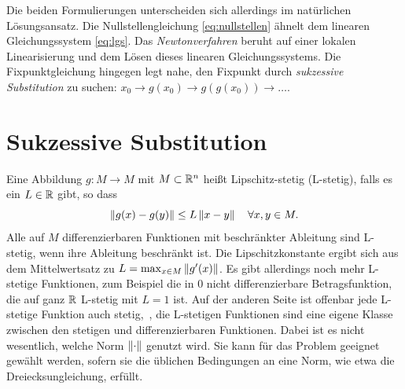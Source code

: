 Die beiden Formulierungen unterscheiden sich allerdings im natürlichen
Lösungsansatz. Die Nullstellengleichung \eqref{eq:nullstellen} ähnelt
dem linearen Gleichungssystem \eqref{eq:lgs}. Das
\emph{Newtonverfahren} beruht auf einer lokalen Linearisierung und dem
Lösen dieses linearen Gleichungssystems. Die Fixpunktgleichung
hingegen legt nahe, den Fixpunkt durch \emph{sukzessive Substitution}
zu suchen: $x_0\to g(x_0)\to g(g(x_0))\to\ldots$.

\section{Sukzessive Substitution}

Eine Abbildung $g:M\to M$ mit $M\subset\mathbb{R}^n$ heißt Lipschitz-stetig
(L-stetig), falls es ein $L\in\mathbb{R}$ gibt, so dass
\begin{equation}
  \left\lVert{g(x) - g(y)}\right\rVert \le L \left\lVert{x - y}\right\rVert\quad\forall x,y\in M.
\end{equation}
Alle auf $M$ differenzierbaren Funktionen mit beschränkter Ableitung
sind L-stetig, wenn ihre Ableitung beschränkt ist. Die
Lipschitzkonstante ergibt sich aus dem Mittelwertsatz zu $L=\max_{x\in
  M}\left\lVert{g'(x)}\right\rVert$.  Es gibt allerdings noch mehr L-stetige Funktionen,
zum Beispiel die in 0 nicht differenzierbare Betragsfunktion, die auf
ganz $\mathbb{R}$ L-stetig mit $L = 1$ ist. Auf der anderen Seite ist
offenbar jede L-stetige Funktion auch stetig, \dh\,, die L-stetigen
Funktionen sind eine eigene Klasse zwischen den stetigen und
differenzierbaren Funktionen. Dabei ist es nicht wesentlich, welche
Norm $\left\lVert{\cdot}\right\rVert$ genutzt wird. Sie kann für das Problem geeignet
gewählt werden, sofern sie die üblichen Bedingungen an eine Norm, wie
etwa die Dreiecksungleichung, erfüllt.


